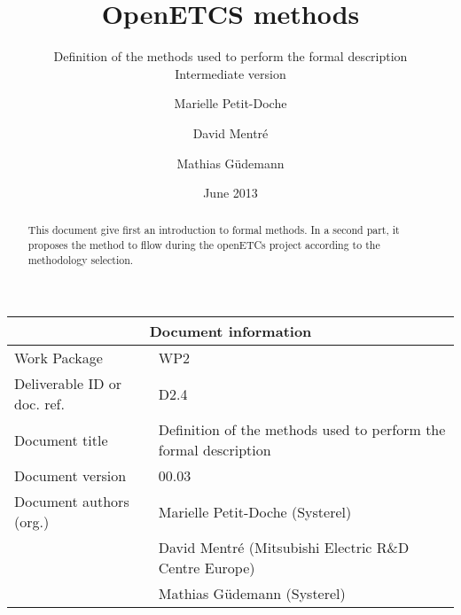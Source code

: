 \documentclass{template/openetcs_article}
\begin{document}
\frontmatter
{}






\title{OpenETCS methods}

\subtitle{ Definition of the methods used to perform the formal description \\
Intermediate version}

\date{June 2013}


\author{Marielle Petit-Doche}


\author{David Mentré}

\author{Mathias Güdemann}


 


\begin{abstract}
This document give first an introduction to formal  methods.
In a second part, it proposes the method to  fllow during the openETCs project according to the methodology selection.

\end{abstract}

\maketitle
\tableofcontents
\listoffiguresandtables
\newpage

\begin{tabular}{|p{4.4cm}|p{8.7cm}|}
\hline
\multicolumn{2}{|c|}{Document information} \\
\hline
Work Package &  WP2  \\
Deliverable ID or doc. ref. & D2.4\\
\hline
Document title & Definition of the methods used to perform the formal description \\
Document version & 00.03 \\
Document authors (org.)  & Marielle Petit-Doche (Systerel)  \\
  & David Mentré (Mitsubishi Electric R\&D Centre Europe)  \\
  & Mathias Güdemann (Systerel)  \\
\hline
\end{tabular}
\end{document}
